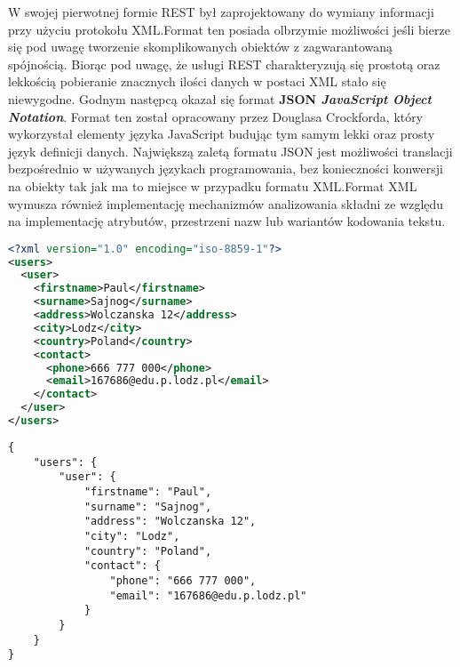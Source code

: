 W swojej pierwotnej formie REST był zaprojektowany do wymiany informacji przy użyciu protokołu XML.\@ Format ten posiada olbrzymie możliwości jeśli bierze się pod uwagę tworzenie skomplikowanych obiektów z zagwarantowaną spójnością. Biorąc pod uwagę, że usługi REST charakteryzują się prostotą oraz lekkością pobieranie znacznych ilości danych w postaci XML stało się niewygodne. Godnym następcą okazał się format \textbf{JSON \textit{JavaScript Object Notation}}. Format ten został opracowany przez Douglasa Crockforda, który wykorzystał elementy języka JavaScript budując tym samym lekki oraz prosty język definicji danych. Największą zaletą formatu JSON jest możliwości translacji bezpośrednio w używanych językach programowania, bez konieczności konwersji na obiekty tak jak ma to miejsce w przypadku formatu XML.\@ Format XML wymusza również implementację mechanizmów analizowania składni ze względu na implementację atrybutów, przestrzeni nazw lub wariantów kodowania tekstu.
\begin{lstlisting}[language=xml, caption=Dane zapisane w formacie XML]
<?xml version="1.0" encoding="iso-8859-1"?>
<users>
  <user>
    <firstname>Paul</firstname>
    <surname>Sajnog</surname>
    <address>Wolczanska 12</address>
    <city>Lodz</city>
    <country>Poland</country>
    <contact>
      <phone>666 777 000</phone>
      <email>167686@edu.p.lodz.pl</email>
    </contact>
  </user>
</users>
\end{lstlisting}
\begin{lstlisting}[caption=Dane zapisane w formacie JSON]
{
    "users": {
        "user": {
            "firstname": "Paul",
            "surname": "Sajnog",
            "address": "Wolczanska 12",
            "city": "Lodz",
            "country": "Poland",
            "contact": {
                "phone": "666 777 000",
                "email": "167686@edu.p.lodz.pl"
            }
        }
    }
}
    \end{lstlisting}
